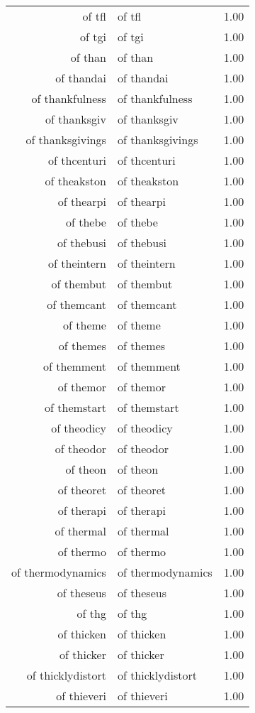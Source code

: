 \begin{table}[ht]
\begin{tabular}{rlr}
  of tfl & of tfl & 1.00 \\ 
  of tgi & of tgi & 1.00 \\ 
  of than & of than & 1.00 \\ 
  of thandai & of thandai & 1.00 \\ 
  of thankfulness & of thankfulness & 1.00 \\ 
  of thanksgiv & of thanksgiv & 1.00 \\ 
  of thanksgivings & of thanksgivings & 1.00 \\ 
  of thcenturi & of thcenturi & 1.00 \\ 
  of theakston & of theakston & 1.00 \\ 
  of thearpi & of thearpi & 1.00 \\ 
  of thebe & of thebe & 1.00 \\ 
  of thebusi & of thebusi & 1.00 \\ 
  of theintern & of theintern & 1.00 \\ 
  of thembut & of thembut & 1.00 \\ 
  of themcant & of themcant & 1.00 \\ 
  of theme & of theme & 1.00 \\ 
  of themes & of themes & 1.00 \\ 
  of themment & of themment & 1.00 \\ 
  of themor & of themor & 1.00 \\ 
  of themstart & of themstart & 1.00 \\ 
  of theodicy & of theodicy & 1.00 \\ 
  of theodor & of theodor & 1.00 \\ 
  of theon & of theon & 1.00 \\ 
  of theoret & of theoret & 1.00 \\ 
  of therapi & of therapi & 1.00 \\ 
  of thermal & of thermal & 1.00 \\ 
  of thermo & of thermo & 1.00 \\ 
  of thermodynamics & of thermodynamics & 1.00 \\ 
  of theseus & of theseus & 1.00 \\ 
  of thg & of thg & 1.00 \\ 
  of thicken & of thicken & 1.00 \\ 
  of thicker & of thicker & 1.00 \\ 
  of thicklydistort & of thicklydistort & 1.00 \\ 
  of thieveri & of thieveri & 1.00 \\ 

\end{tabular}
\end{table}

